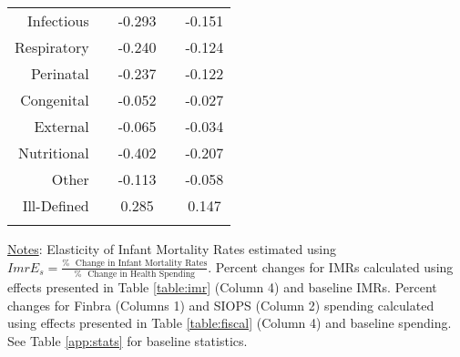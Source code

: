 \begin{table}[h!]
\begin{footnotesize}
\begin{center}
{\begin{threeparttable}[b]
\begin{tabular}{rrrrr}
    \multicolumn{1}{p{15.145em}}{Infectious} &       & \multicolumn{1}{c}{-0.293} &       & \multicolumn{1}{c}{-0.151} \\
    \multicolumn{1}{p{15.145em}}{Respiratory} &       & \multicolumn{1}{c}{-0.240} &       & \multicolumn{1}{c}{-0.124} \\
    \multicolumn{1}{p{15.145em}}{Perinatal} &       & \multicolumn{1}{c}{-0.237} &       & \multicolumn{1}{c}{-0.122} \\
    \multicolumn{1}{p{15.145em}}{Congenital} &       & \multicolumn{1}{c}{-0.052} &       & \multicolumn{1}{c}{-0.027} \\
    \multicolumn{1}{p{15.145em}}{External} &       & \multicolumn{1}{c}{-0.065} &       & \multicolumn{1}{c}{-0.034} \\
    \multicolumn{1}{p{15.145em}}{Nutritional} &       & \multicolumn{1}{c}{-0.402} &       & \multicolumn{1}{c}{-0.207} \\
    \multicolumn{1}{p{15.145em}}{Other} &       & \multicolumn{1}{c}{-0.113} &       & \multicolumn{1}{c}{-0.058} \\
    \multicolumn{1}{p{15.145em}}{Ill-Defined} &       & \multicolumn{1}{c}{0.285} &       & \multicolumn{1}{c}{0.147} \\
          &       &       &       &  \\
    \bottomrule
    \bottomrule
    \end{tabular}%
    
    
        \begin{tablenotes}
  \scriptsize{\underline{Notes}: Elasticity of Infant Mortality Rates estimated using $ImrE_s = \frac{\% \, \, \textrm{ Change in Infant Mortality Rates}}{\% \, \, \textrm{ Change in Health Spending}}$. Percent changes for IMRs calculated using effects presented in Table \ref{table:imr} (Column 4) and baseline IMRs. Percent changes for Finbra (Columns 1) and SIOPS (Column 2) spending calculated using effects presented in Table \ref{table:fiscal} (Column 4) and baseline spending. See Table \ref{app:stats} for baseline statistics.}
  \end{tablenotes}
    
  \label{table:elasticity}%

\end{threeparttable}
}
\end{center}
\end{footnotesize}
\end{table}
